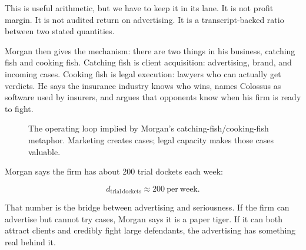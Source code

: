 This is useful arithmetic, but we have to keep it in its lane. It is not profit margin. It is not audited return on advertising. It is a transcript-backed ratio between two stated quantities.

Morgan then gives the mechanism: there are two things in his business, catching fish and cooking fish. Catching fish is client acquisition: advertising, brand, and incoming cases. Cooking fish is legal execution: lawyers who can actually get verdicts. He says the insurance industry knows who wins, names Colossus as software used by insurers, and argues that opponents know when his firm is ready to fight.

\begin{figure}
\centering
{}
\caption{The operating loop implied by Morgan's catching-fish/cooking-fish metaphor. Marketing creates cases; legal capacity makes those cases valuable.}
\end{figure}

Morgan says the firm has about 200 trial dockets each week:

\begin{equation}
d_{\mathrm{trial\ dockets}}
\approx
200\ \mathrm{per\ week}.
\end{equation}

That number is the bridge between advertising and seriousness. If the firm can advertise but cannot try cases, Morgan says it is a paper tiger. If it can both attract clients and credibly fight large defendants, the advertising has something real behind it.

